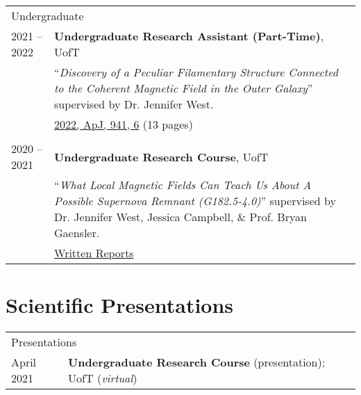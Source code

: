 \documentclass[10pt]{res} %
\begin{document}
\begin{resume}
\begin{table}[h!]
\begin{tabularx}{\textwidth}{ @{} p{6.5em} X @{} }
\multicolumn{2}{l}{ \rule{0pt}{3ex} \large \hspace{-12pt} Undergraduate \dotfill \rule[-1.2ex]{0pt}{0pt}} \\ 
2021 -- 2022 & \textbf{Undergraduate Research Assistant (Part-Time)}, UofT \\
                     & ``\textit{Discovery of a Peculiar Filamentary Structure Connected to the Coherent Magnetic Field in the Outer Galaxy}'' supervised by Dr. Jennifer West. \\
                     & \href{https://iopscience.iop.org/article/10.3847/1538-4357/ac9b58}{2022, ApJ, 941, 6} (13 pages) \\
\\
2020 -- 2021 & \textbf{Undergraduate Research Course}, UofT \\
                     & ``\textit{What Local Magnetic Fields Can Teach Us About A Possible Supernova Remnant (G182.5-4.0)}'' supervised by Dr. Jennifer West, Jessica Campbell, $\&$ Prof. Bryan Gaensler. \\
                     & \href{https://github.com/parampreetastro/AST425}{Written Reports}
\end{tabularx}
\end{table}



\section{\Large Scientific Presentations}
\vspace{-5pt} %
\noindent\makebox[\linewidth]{\rule{\textwidth}{0.4pt}}
\vspace{-20pt} %

\begin{table}[h!]
\begin{tabularx}{\textwidth}{lX}
\multicolumn{2}{l}{ \rule{0pt}{3ex} \large \hspace{-12pt} Presentations \dotfill \rule[-1.2ex]{0pt}{0pt}} \\
April 2021 & \textbf{Undergraduate Research Course} (presentation); UofT (\textit{virtual})
\end{tabularx}


\end{table}
\end{resume}
\end{document}
